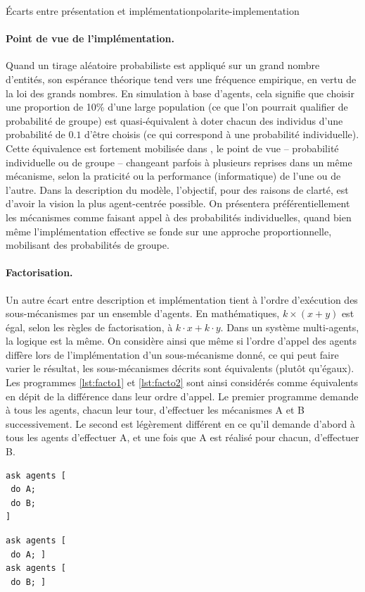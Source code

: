 \begin{encadre}{Écarts entre présentation et implémentation}{polarite-implementation}
\paragraph{Point de vue de l'implémentation.} Quand un tirage aléatoire probabiliste est appliqué sur un grand nombre d'entités, son espérance théorique tend vers une fréquence empirique, en vertu de la loi des grands nombres.
En simulation à base d'agents, cela signifie que choisir une proportion de 10\% d'une large population (ce que l'on pourrait qualifier de \og probabilité de groupe\fg{}) est quasi-équivalent à doter chacun des individus d'une probabilité de $0.1$ d'être choisis (ce qui correspond à une \og probabilité individuelle\fg{}).
Cette équivalence est fortement mobilisée dans \simfeodal{}, le \og point de vue\fg{} -- probabilité individuelle ou de groupe -- changeant parfois à plusieurs reprises dans un même mécanisme, selon la praticité ou la performance (informatique) de l'une ou de l'autre.
Dans la description du modèle, l'objectif, pour des raisons de clarté, est d'avoir la vision la plus \og agent-centrée\fg{} possible.
On présentera préférentiellement les mécanismes comme faisant appel à des probabilités individuelles, quand bien même l'implémentation effective se fonde sur une approche proportionnelle, mobilisant des probabilités de groupe.

\paragraph{Factorisation.} Un autre écart entre description et implémentation tient à l'ordre d'exécution des sous-mécanismes par un ensemble d'agents.
En mathématiques, $k\times (x+y)$ est égal, selon les règles de factorisation, à $k{\cdot}x + k{\cdot}y$.
Dans un système multi-agents, la logique est la même.
On considère ainsi que même si l'ordre d'appel des agents diffère lors de l'implémentation d'un sous-mécanisme donné, ce qui peut faire varier le résultat, les sous-mécanismes décrits sont équivalents (plutôt qu'égaux).
Les programmes \ref{lst:facto1} et \ref{lst:facto2} sont ainsi considérés comme équivalents en dépit de la différence dans leur ordre d'appel.
Le premier programme demande à tous les agents, chacun leur tour, d'effectuer les mécanismes A et B successivement.
Le second est légèrement différent en ce qu'il demande d'abord à tous les agents d'effectuer A, et une fois que A est réalisé pour chacun, d'effectuer B.\bigskip

\noindent\begin{minipage}[b]{.45\textwidth}
	\begin{lstlisting}[caption={Factorisé},frame=tlrb, captionpos=b, label = {lst:facto1}]
ask agents [
 do A;
 do B;
]
	\end{lstlisting}
\end{minipage}\hfill
\begin{minipage}[b]{.45\textwidth}
	\begin{lstlisting}[caption={Développé},frame=tlrb, captionpos=b, label = {lst:facto2}]
ask agents [
 do A; ]
ask agents [
 do B; ]
	\end{lstlisting}
\end{minipage}


\end{encadre}
